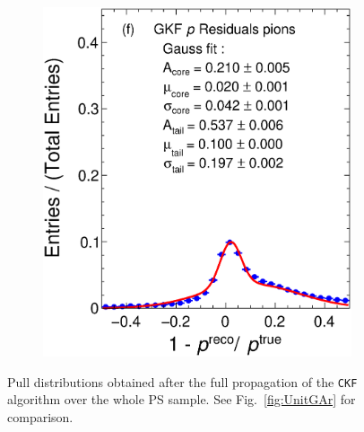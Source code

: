 \begin{figure}[t]
\begin{subfigure}{0.32\textwidth}
         \caption{}
         \label{fig:pResGKF211_Int}
     \end{subfigure}
          \begin{subfigure}{0.32\textwidth}
         \centering
         \includegraphics[width=\textwidth]{figures/ch5-KF_NDGAr/FullSample/Int/pRes/1D/RespGAr2212.eps}
         \caption{}
         \label{fig:pResGKF2212_Int}
     \end{subfigure}
        \caption{Pull distributions obtained after the full propagation of the \texttt{CKF} algorithm over the whole PS sample. See Fig.~\ref{fig:UnitGAr} for comparison.}
        \label{fig:pRes1D_Int}
\end{figure}

